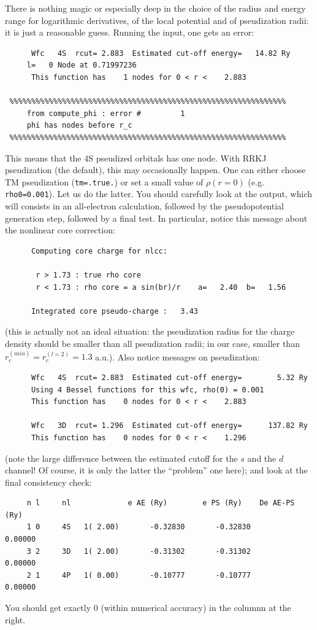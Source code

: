 \documentclass[12pt,a4paper]{article}
\begin{document}
There is nothing magic or especially deep in the choice of the radius
and energy range for logarithmic derivatives, of the local 
potential and of pseudization radii: it is just a reasonable guess.
Running the input, one gets an error:
\begin{verbatim}
      Wfc   4S  rcut= 2.883  Estimated cut-off energy=   14.82 Ry
     l=   0 Node at 0.71997236
      This function has    1 nodes for 0 < r <    2.883

 %%%%%%%%%%%%%%%%%%%%%%%%%%%%%%%%%%%%%%%%%%%%%%%%%%%%%%%%%%%%%%%
     from compute_phi : error #         1
     phi has nodes before r_c
 %%%%%%%%%%%%%%%%%%%%%%%%%%%%%%%%%%%%%%%%%%%%%%%%%%%%%%%%%%%%%%%
\end{verbatim}
This means that the 4S pseudized orbitals has one node. With RRKJ 
pseudization (the default), this may occasionally happen. One can
either choose TM pseudization (\texttt{tm=.true.}) or set a small
value of $\rho(r=0)$ (e.g. \texttt{rho0=0.001}). Let us do the latter.
You should carefully look at the output, which will consists in
an all-electron calculation, followed by the pseudopotential generation
step, followed by a final test. In particular, notice this message
about the nonlinear core correction:
\begin{verbatim}
      Computing core charge for nlcc:

       r > 1.73 : true rho core
       r < 1.73 : rho core = a sin(br)/r    a=   2.40  b=   1.56

      Integrated core pseudo-charge :   3.43
\end{verbatim}
(this is actually not an ideal situation: the pseudization radius for the 
charge density should be smaller than all pseudization radii; in our 
case, smaller than $r_c^{(min)} = r_c^{(l=2)}=1.3$ a.u.). 
Also notice messages on pseudization:
\begin{verbatim}
      Wfc   4S  rcut= 2.883  Estimated cut-off energy=        5.32 Ry
      Using 4 Bessel functions for this wfc, rho(0) = 0.001
      This function has    0 nodes for 0 < r <    2.883

      Wfc   3D  rcut= 1.296  Estimated cut-off energy=      137.82 Ry
      This function has    0 nodes for 0 < r <    1.296
\end{verbatim}
(note the large difference between the estimated cutoff for the $s$ and
the $d$ channel! Of course, it is only the latter the ``problem'' one 
here); and look at the final consistency check:
\begin{verbatim}
     n l     nl             e AE (Ry)        e PS (Ry)    De AE-PS (Ry)
     1 0     4S   1( 2.00)       -0.32830       -0.32830        0.00000
     3 2     3D   1( 2.00)       -0.31302       -0.31302        0.00000
     2 1     4P   1( 0.00)       -0.10777       -0.10777        0.00000
\end{verbatim}
You should get exactly 0 (within numerical accuracy) in the columnn
at the right. 
\end{document}
